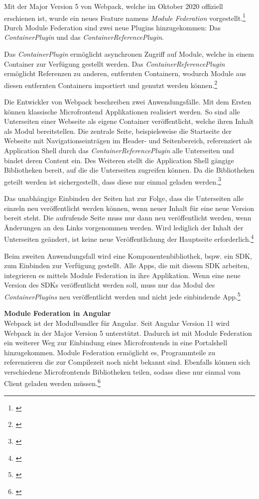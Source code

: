 Mit der Major Version 5 von Webpack, welche im Oktober 2020 offiziell erschienen ist, wurde ein neues Feature namens \textit{Module Federation} vorgestellt.\footnote{\cite[vgl.][]{Webpack2020a}} Durch Module Federation sind zwei neue Plugins hinzugekommen: Das \textit{ContainerPlugin} und das \textit{ContainerReferencePlugin}.

Das \textit{ContainerPlugin} ermöglicht asynchronen Zugriff auf Module, welche in einem Container zur Verfügung gestellt werden. Das \textit{ContainerReferencePlugin} ermöglicht Referenzen zu anderen, entfernten Containern, wodurch Module aus diesen entfernten Containern importiert und genutzt werden können.\footnote{\cite[vgl.][]{Webpack2020b}}

Die Entwickler von Webpack beschreiben zwei Anwendungsfälle. Mit dem Ersten können klassische Microfrontend Applikationen realisiert werden. So sind alle Unterseiten einer Webseite als eigene Container veröffentlicht, welche ihren Inhalt als Modul bereitstellen. Die zentrale Seite, beispielsweise die Startseite der Webseite mit Navigationseinträgen im Header- und Seitenbereich, referenziert als Application Shell durch das \textit{ContainerReferencePlugin} alle Unterseiten und bindet deren Content ein. Des Weiteren stellt die Application Shell gängige Bibliotheken bereit, auf die die Unterseiten zugreifen können. Da die Bibliotheken geteilt werden ist sichergestellt, dass diese nur einmal geladen werden.\footnote{\cite[vgl.][]{Webpack2020b}}

Das unabhängige Einbinden der Seiten hat zur Folge, dass die Unterseiten alle einzeln neu veröffentlicht werden können, wenn neuer Inhalt für eine neue Version bereit steht. Die aufrufende Seite muss nur dann neu veröffentlicht werden, wenn Änderungen an den Links vorgenommen werden. Wird lediglich der Inhalt der Unterseiten geändert, ist keine neue Veröffentlichung der Hauptseite erforderlich.\footnote{\cite[vgl.][]{Webpack2020b}}

Beim zweiten Anwendungsfall wird eine Komponentenbibliothek, bspw. ein \gls{SDK}, zum Einbinden zur Verfügung gestellt. Alle Apps, die mit diesem \gls{SDK} arbeiten, integrieren es mittels Module Federation in ihre Applikation. Wenn eine neue Version des \gls{SDK}s veröffentlicht werden soll, muss nur das Modul des \textit{ContainerPlugins} neu veröffentlicht werden und nicht jede einbindende App.\footnote{\cite[vgl.][]{Webpack2020b}}

\textbf{Module Federation in Angular}\\
Webpack ist der Modulbundler für Angular. Seit Angular Version 11 wird Webpack in der Major Version 5 unterstützt. Dadurch ist mit Module Federation ein weiterer Weg zur Einbindung eines Microfrontends in eine Portalshell hinzugekommen. Module Federation ermöglicht es, Programmteile zu referenzieren die zur Compilezeit noch nicht bekannt sind. Ebenfalls können sich verschiedene Microfrontends Bibliotheken teilen, sodass diese nur einmal vom Client geladen werden müssen.\footnote{\cite[vgl.][39]{Steyer2020}}

